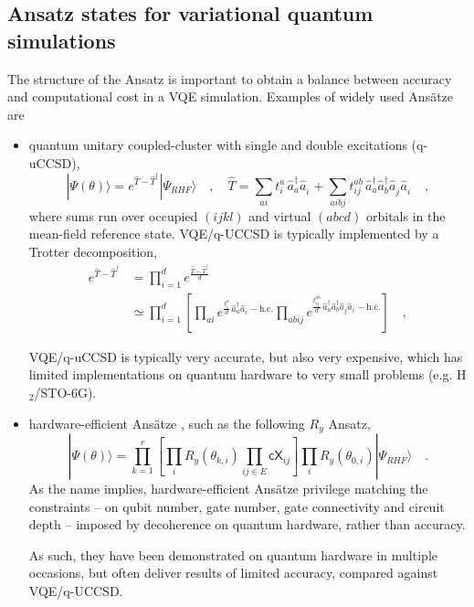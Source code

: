 \documentclass{article}
\newcommand{\CRE}[1]{\hat{a}^\dagger_{#1}}
\newcommand{\DIS}[1]{\hat{a}^{\phantom{\dagger}}_{#1}}
\begin{document}
\subsection{Ansatz states for variational quantum simulations}

The structure of the Ansatz is important to obtain a balance between accuracy and computational cost in a VQE simulation. 
Examples of widely used Ans\"{a}tze are
\begin{itemize}
\item quantum unitary coupled-cluster \cite{harsha2018difference,barkoutsos2018quantum,evangelista2019exact,sokolov2020quantum} 
with single and double excitations (q-uCCSD),
\begin{equation}
| \Psi(\theta) \rangle = e^{ \hat{T} - \hat{T}^\dagger } | \Psi_{RHF} \rangle 
\quad,\quad
\hat{T} = \sum_{ai} t^a_i \, \CRE{a} \DIS{i} + \sum_{aibj} t^{ab}_{ij} \, \CRE{a} \CRE{b} \DIS{j} \DIS{i}
\quad,
\end{equation}
where sums run over occupied $(ijkl)$ and virtual $(abcd)$ orbitals in the mean-field reference state. 
VQE/q-UCCSD is typically implemented by a Trotter decomposition,
\begin{equation}
\begin{split}
e^{ \hat{T} - \hat{T}^\dagger } &= \prod_{i=1}^d e^{ \frac{\hat{T} - \hat{T}^\dagger}{d} } \\
&\simeq
\prod_{i=1}^d \left[ \prod_{ai} e^{ \frac{t^a_i}{d} \, \CRE{a} \DIS{i} - \mathrm{h.c.}} \prod_{abij} e^{ \frac{t^{ab}_{ij}}{d} \, \CRE{a} \CRE{b} \DIS{j} \DIS{i} - \mathrm{h.c.}}
\right]
\quad,
\end{split}
\end{equation}


VQE/q-uCCSD
is typically very accurate, but also very expensive, which has limited implementations on quantum hardware to very
small problems (e.g. H$_2$/STO-6G).
\item hardware-efficient Ans\"{a}tze \cite{kandala2017hardware}, such as the following $R_y$ Ansatz,
\begin{equation}
| \Psi(\theta) \rangle = \prod_{k=1}^r \left[ \prod_i R_y(\theta_{k,i}) \prod_{ij \in E} \mathsf{cX}_{ij} \right] \prod_i R_y(\theta_{0,i}) | \Psi_{RHF} \rangle 
\quad.
\end{equation}
As the name implies, hardware-efficient Ans\"{a}tze privilege matching the constraints -- on qubit number, gate number,
gate connectivity and circuit depth -- imposed by decoherence on quantum hardware, rather than accuracy. 

As such, they have been demonstrated on quantum hardware in multiple occasions, but often deliver results of limited 
accuracy, compared against VQE/q-UCCSD.
\end{itemize}
\end{document}
